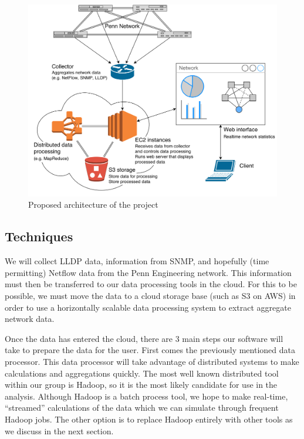 \documentclass{sig-alternate}
\begin{document}
\begin{figure}[htb!]
    \centering
    \includegraphics[width=\linewidth]{mockup}
    \caption{Proposed architecture of the project}
    \label{fig:mockup}
\end{figure}

\subsection{Techniques}

We will collect LLDP data, information from SNMP, and hopefully (time
permitting) Netflow data from the Penn Engineering network. This information
must then be transferred to our data processing tools in the cloud. For this to
be possible, we must move the data to a cloud storage base (such as S3 on AWS)
in order to use a horizontally scalable data processing system to extract
aggregate network data.

Once the data has entered the cloud, there are 3 main steps our software will
take to prepare the data for the user. First comes the previously mentioned data
processor. This data processor will take advantage of distributed systems to
make calculations and aggregations quickly. The most well known distributed tool
within our group is Hadoop, so it is the most likely candidate for use in the
analysis. Although Hadoop is a batch process tool, we hope to make real-time,
``streamed'' calculations of the data which we can simulate through frequent
Hadoop jobs. The other option is to replace Hadoop entirely with other tools as
we discuss in the next section.
\end{document}

